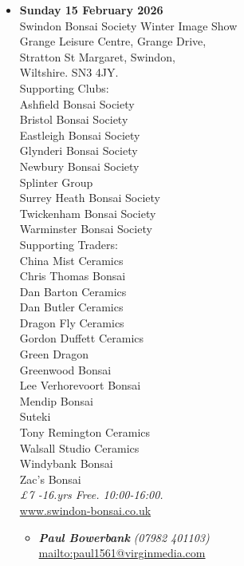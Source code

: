 \begin{itemize}
    \item \textbf{Sunday 15 February 2026}
    \\
    Swindon Bonsai Society Winter Image Show \\
    Grange Leisure Centre, Grange Drive, \\
    Stratton St Margaret, Swindon, \\
    Wiltshire. SN3 4JY. \\
    Supporting Clubs: \\
    Ashfield Bonsai Society \\
    Bristol Bonsai Society \\
    Eastleigh Bonsai Society \\
    Glynderi Bonsai Society \\
    Newbury Bonsai Society \\
    Splinter Group \\
    Surrey Heath Bonsai Society \\
    Twickenham Bonsai Society \\
    Warminster Bonsai Society \\
    Supporting Traders: \\
    China Mist Ceramics \\
    Chris Thomas Bonsai \\
    Dan Barton Ceramics \\
    Dan Butler Ceramics \\
    Dragon Fly Ceramics \\
    Gordon Duffett Ceramics \\
    Green Dragon \\
    Greenwood Bonsai \\
    Lee Verhorevoort Bonsai \\
    Mendip Bonsai \\
    Suteki \\
    Tony Remington Ceramics \\
    Walsall Studio Ceramics \\
    Windybank Bonsai \\
    Zac's Bonsai
    \\
    \emph{£7 -16.yrs Free. 10:00-16:00.}
    \\
    \href{http://www.swindon-bonsai.co.uk/}{www.swindon-bonsai.co.uk}
    \begin{itemize}
        \item \textbf{\emph{Paul Bowerbank}} \emph{(07982 401103)} \\
        \href{mailto:mailto:paul1561@virginmedia.com}{mailto:paul1561@virginmedia.com} 
    \end{itemize}


\end{itemize}
